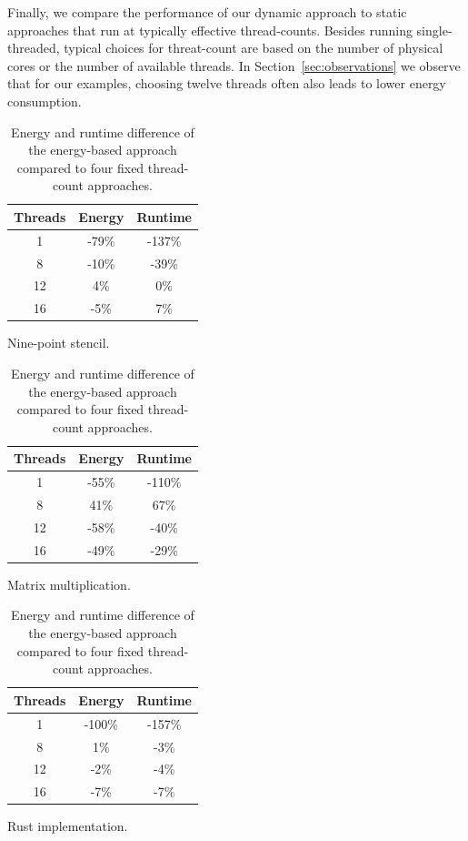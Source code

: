 Finally, we compare the performance of our dynamic approach to static approaches that run at
typically effective thread-counts. Besides running single-threaded, typical choices for threat-count
are based on the number of physical cores or the number of available threads. In
Section~\ref{sec:observations} we observe that for our examples, choosing twelve threads often also
leads to lower energy consumption.

\begin{table}[ht]
    \centering
    \begin{subtable}{0.33\linewidth}
        \centering
        \begin{tabular}{ccc}\hline
            Threads & Energy & Runtime \\\hline
            1       &  -79\% &  -137\% \\
            8       &  -10\% &   -39\% \\
            12      &    4\% &     0\% \\
            16      &   -5\% &     7\% \\\hline
        \end{tabular}
        \caption{Nine-point stencil.}
        \label{tab:static-stencil}
    \end{subtable}%
    \begin{subtable}{0.33\linewidth}
        \centering
        \begin{tabular}{ccc}\hline
            Threads & Energy & Runtime \\\hline
            1       &  -55\% &  -110\% \\
            8       &   41\% &    67\% \\
            12      &  -58\% &   -40\% \\
            16      &  -49\% &   -29\% \\\hline
        \end{tabular}
        \caption{Matrix multiplication.}
        \label{tab:static-matmul}
    \end{subtable}%
    \begin{subtable}{0.33\linewidth}
        \centering
        \begin{tabular}{ccc}\hline
            Threads & Energy & Runtime \\\hline
            1       & -100\% &  -157\% \\
            8       &    1\% &    -3\% \\
            12      &   -2\% &    -4\% \\
            16      &   -7\% &    -7\% \\\hline
        \end{tabular}
        \caption{Rust implementation.}
        \label{tab:static-rust}
    \end{subtable}%
    \caption{Energy and runtime difference of the energy-based approach compared to four fixed
    thread-count approaches.}
    \label{fig:static}
\end{table}


